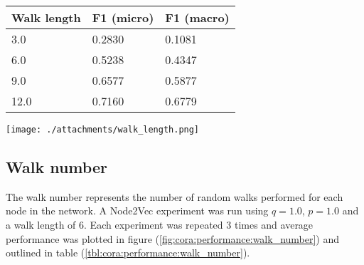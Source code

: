 \documentclass[a4paper,10pt]{article}
\begin{document}
\vspace{1em}



  \begin{minipage}[c][17em]{0.49\textwidth}
    \begin{tabular}{m{4em} m{7em} m{7em}}

      \hline
      Walk length & F1 (micro)  & F1 (macro) \\
      \hline\hline

      3.0	& 0.2830	& 0.1081 \\
      \hline
      6.0	& 0.5238	& 0.4347 \\
      \hline
      9.0	& 0.6577	& 0.5877 \\
      \hline
      12.0	& 0.7160	& 0.6779 \\
      \hline

    \end{tabular}

    \label{tbl:cora:performance:walk_length}


  \end{minipage}
\hfill
  \begin{minipage}[c][17em]{0.49\textwidth}

    \texttt{[image: ./attachments/walk\_length.png]}
      \label{fig:cora:performance:walk_length}



  \end{minipage}


\subsection{Walk number}

The walk number represents the number of random walks performed for each node in the network. A Node2Vec experiment was run using $q = 1.0$, $p = 1.0$ and a walk length of $6$. Each experiment was repeated 3 times and average performance was plotted in figure (\ref{fig:cora:performance:walk_number}) and outlined in table (\ref{tbl:cora:performance:walk_number}).
\end{document}
